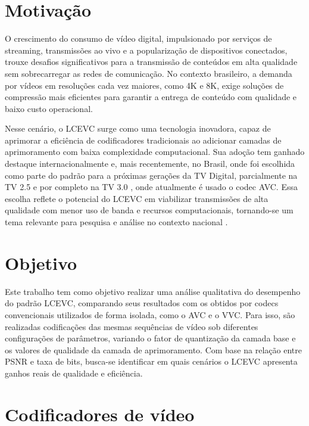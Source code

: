\section{Motivação}

O crescimento do consumo de vídeo digital, impulsionado por serviços de streaming, transmissões ao vivo e a 
popularização de dispositivos conectados, trouxe desafios significativos para a transmissão de conteúdos em 
alta qualidade sem sobrecarregar as redes de comunicação. No contexto brasileiro, a demanda por vídeos em 
resoluções cada vez maiores, como 4K e 8K, exige soluções de compressão mais eficientes para garantir a 
entrega de conteúdo com qualidade e baixo custo operacional.

Nesse cenário, o \acrfull{LCEVC} surge como uma tecnologia inovadora, 
capaz de aprimorar a eficiência de codificadores tradicionais ao adicionar camadas de aprimoramento com baixa 
complexidade computacional. Sua adoção tem ganhado destaque internacionalmente e, mais recentemente, no Brasil, 
onde foi escolhida como parte do padrão para a próximas gerações da TV Digital, parcialmente na TV 2.5 e por 
completo na TV 3.0 \cite{tv_25}, onde atualmente é usado o codec \acrfull{AVC}. Essa escolha reflete o 
potencial do \acrshort{LCEVC} em viabilizar transmissões de alta qualidade com menor uso de banda e recursos 
computacionais, tornando-se um tema relevante para pesquisa e análise no contexto nacional \cite{lcevc_tvdigital, globo_lcevc}.

\section{Objetivo}

Este trabalho tem como objetivo realizar uma análise qualitativa do desempenho do padrão \acrfull{LCEVC}, comparando 
seus resultados com os obtidos por codecs convencionais utilizados de forma isolada, como o \acrshort{AVC} e o 
\acrshort{VVC}. Para isso, são realizadas codificações das mesmas sequências de vídeo sob diferentes configurações
de parâmetros, variando o fator de quantização da camada base e os valores de qualidade da camada de aprimoramento. 
Com base na relação entre \acrshort{PSNR} e taxa de bits, busca-se identificar em quais cenários o \acrshort{LCEVC}
apresenta ganhos reais de qualidade e eficiência.

\section{Codificadores de vídeo}%

